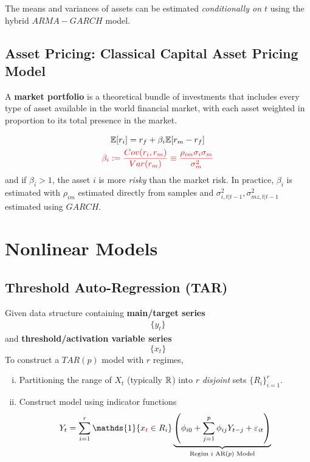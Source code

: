 \documentclass[11pt]{article}
\begin{document}
			\begin{remark}
				The means and variances of assets can be estimated \emph{conditionally on $t$} using the hybrid $ARMA-GARCH$ model.
			\end{remark}
		
		\subsection{Asset Pricing: Classical Capital Asset Pricing Model}
			\begin{definition}
				A \textbf{market portfolio} is a theoretical bundle of investments that includes every type of asset available in the world financial market, with each asset weighted in proportion to its total presence in the market.
			\end{definition}
			
			\begin{proposition}
				\begin{gather}
					\mathbb{E}[{r_i}] = r_f + \beta_i \mathbb{E}[{r_m - r_f}] \\
					\textcolor{red}{\beta_i := \frac{Cov(r_i, r_m)}{Var(r_m)} \equiv \frac{\rho_{im}\sigma_i \sigma_m}{\sigma_m^2}}
				\end{gather}
				and if $\beta_i > 1$, the asset $i$ is more \emph{risky} than the market risk. In practice, $\beta_i$ is estimated with $\rho_{im}$ estimated directly from samples and $\sigma^2_{i, t|t-1}, \sigma^2_{mz, t|t-1}$ estimated using $GARCH$.
			\end{proposition}
	
	\section{Nonlinear Models}
		\subsection{Threshold Auto-Regression (TAR)}
			\begin{definition}
				Given data structure containing \textbf{main/target series}
				\begin{gather}
					\{y_t\}
				\end{gather}
				and \textbf{threshold/activation variable series}
				\begin{equation}
					\{x_t\}
				\end{equation}
				To construct a $TAR(p)$ model with $r$ regimes, 
				\begin{enumerate}[(i)]
					\item Partitioning the range of $X_t$ (typically $\mathbb{R}$) into $r$ \emph{disjoint} sets $\{R_i\}_{i=1}^r$.
					\item Construct model using indicator functions
					\begin{equation}
						Y_t = \sum_{i=1}^r \mathds{1}\{x_{\red{t}} \in R_i\} 
						\underbrace{\left(
							\phi_{i0} + \sum_{j=1}^p \phi_{ij} Y_{t-j} + \varepsilon_{it}
						\right)}_{\tx{Regim $i$ AR($p$) Model}}
					\end{equation}
				\end{enumerate}
			\end{definition}
		
\end{document}
